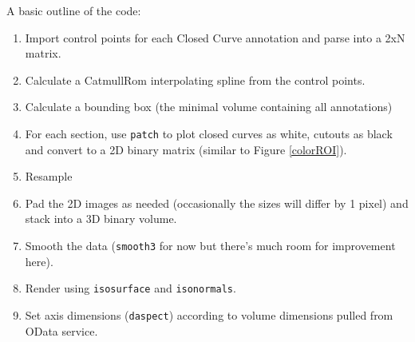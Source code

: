 \documentclass[12pt]{exam}
\begin{document}
	A basic outline of the code: 
	\begin{enumerate}
		\item Import control points for each Closed Curve annotation and parse into a 2xN matrix.
		\item Calculate a CatmullRom interpolating spline from the control points.
		\item Calculate a bounding box (the minimal volume containing all annotations)
		\item For each section, use \texttt{patch} to plot closed curves as white, cutouts as black and convert to a 2D binary matrix (similar to Figure \ref{colorROI}). 
		\item Resample
		\item Pad the 2D images as needed (occasionally the sizes will differ by 1 pixel) and stack into a 3D binary volume.
		\item Smooth the data (\texttt{smooth3} for now but there's much room for improvement here).
		\item Render using \texttt{isosurface} and \texttt{isonormals}.
		\item Set axis dimensions (\texttt{daspect}) according to volume dimensions pulled from OData service. 
	\end{enumerate}
\end{document}
